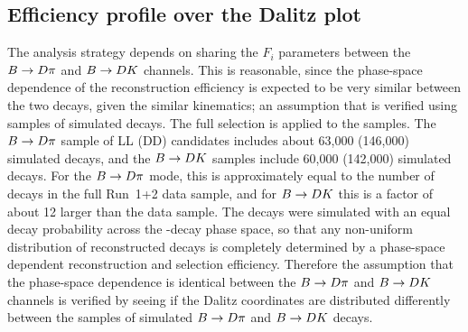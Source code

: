 


\subsection{Efficiency profile over the Dalitz plot} %
\label{sub:efficiency_profile_over_the_dalitz_plot}



The analysis strategy depends on sharing the $F_i$ parameters between the ${B}\rightarrow{\ensuremath{D}}\pi$ and ${B}\rightarrow{\ensuremath{D}}{\ensuremath{K}}$ channels. This is reasonable, since the phase-space dependence of the reconstruction efficiency is expected to be very similar between the two decays, given the similar kinematics; an assumption that is verified using samples of simulated decays. The full selection is applied to the samples. The ${B}\rightarrow{\ensuremath{D}}\pi$ sample of LL (DD) candidates includes about 63,000 (146,000) simulated decays, and the ${B}\rightarrow{\ensuremath{D}}{\ensuremath{K}}$ samples include 60,000 (142,000) simulated decays. For the ${B}\rightarrow{\ensuremath{D}}\pi$ mode, this is approximately equal to the number of decays in the full Run~1+2 data sample, and for ${B}\rightarrow{\ensuremath{D}}{\ensuremath{K}}$ this is a factor of about 12 larger than the data sample. The decays were simulated with an equal decay probability across the \D-decay phase space, so that any non-uniform distribution of reconstructed decays is completely determined by a phase-space dependent reconstruction and selection efficiency. Therefore the assumption that the phase-space dependence is identical between the ${B}\rightarrow{\ensuremath{D}}\pi$ and ${B}\rightarrow{\ensuremath{D}}{\ensuremath{K}}$ channels is verified by seeing if the Dalitz coordinates are distributed differently between the samples of simulated ${B}\rightarrow{\ensuremath{D}}\pi$ and ${B}\rightarrow{\ensuremath{D}}{\ensuremath{K}}$ decays.

